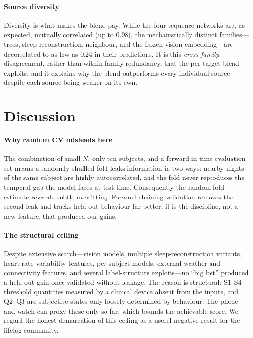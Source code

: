 \documentclass[conference]{IEEEtran}
\begin{document}
\paragraph{Source diversity} Diversity is what makes the blend pay. While the four
sequence networks are, as expected, mutually correlated (up to $0.98$), the
mechanistically distinct families---trees, sleep reconstruction, neighbour, and the
frozen vision embedding---are decorrelated to as low as $0.24$ in their predictions.
It is this \emph{cross-family} disagreement, rather than within-family redundancy,
that the per-target blend exploits, and it explains why the blend outperforms every
individual source despite each source being weaker on its own.

\section{Discussion}
\label{sec:disc}

\paragraph{Why random CV misleads here} The combination of small $N$, only ten
subjects, and a forward-in-time evaluation set means a randomly shuffled fold leaks
information in two ways: nearby nights of the same subject are highly autocorrelated,
and the fold never reproduces the temporal gap the model faces at test time.
Consequently the random-fold estimate rewards subtle overfitting. Forward-chaining
validation removes the second leak and tracks held-out behaviour far better; it is the
discipline, not a new feature, that produced our gains.

\paragraph{The structural ceiling} Despite extensive search---vision models, multiple
sleep-reconstruction variants, heart-rate-variability textures, per-subject models,
external weather and connectivity features, and several label-structure
exploits---no ``big bet'' produced a held-out gain once validated without leakage.
The reason is structural: S1--S4 threshold quantities measured by a clinical device
absent from the inputs, and Q2--Q3 are subjective states only loosely determined by
behaviour. The phone and watch can proxy these only so far, which bounds the
achievable score. We regard the honest demarcation of this ceiling as a useful
negative result for the lifelog community.
\end{document}

